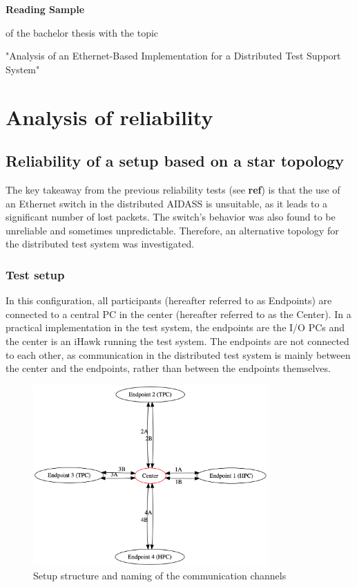\documentclass[	a4paper,
				11pt,
				DIV=11,
				bigheadings,
				idxtotoc,
				listof=totoc,	
				bibtotoc,		
				halfparskip,
				cleardoubleempty,
				oneside,
				openright]{scrartcl}
\begin{document}

\begin{center}	
		\vspace{1cm}
		
		\huge\textbf{Reading Sample}\\[2.5em]
		\normalsize
		
		
		of the bachelor thesis with the topic
		
		"Analysis of an Ethernet-Based Implementation for a Distributed Test Support System"
\end{center}
\cleardoublepage


\tableofcontents
\cleardoublepage


\section{Analysis of reliability} \label{Analysis of reliability}
\subsection{Reliability of a setup based on a star topology}
The key takeaway from the previous reliability tests (see \textbf{ref}) is that the use of an Ethernet switch in the distributed AIDASS is unsuitable, as it leads to a significant number of lost packets. The switch's behavior was also found to be unreliable and sometimes unpredictable. Therefore, an alternative topology for the distributed test system was investigated.

\subsubsection{Test setup}
In this configuration, all participants (hereafter referred to as Endpoints) are connected to a central PC in the center (hereafter referred to as the Center). In a practical implementation in the test system, the endpoints are the I/O PCs and the center is an iHawk running the test system. The endpoints are not connected to each other, as communication in the distributed test system is mainly between the center and the endpoints, rather than between the endpoints themselves.

\begin{figure}[h]
	\includegraphics[width=9cm]{fig1.png}
	\centering
	\caption{Setup structure and naming of the communication channels}
    \label{fig:fig1}
\end{figure}
\end{document}
